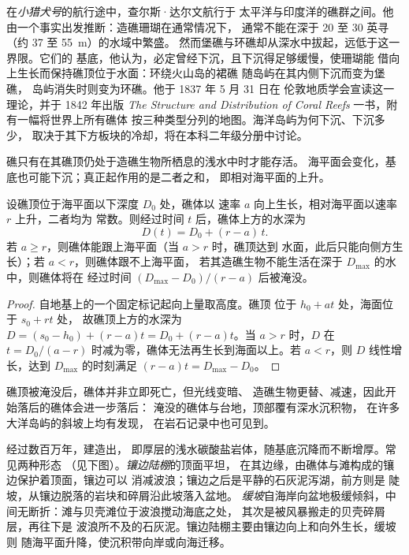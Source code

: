 
\begin{history}[沉降基底上的礁，1837--1842]
在\emph{小猎犬号}的航行途中，查尔斯·达尔文航行于
太平洋与印度洋的礁群之间。他由一个事实出发推断：造礁珊瑚在通常情况下，
通常不能在深于 20 至 30 英寻（约 37 至 \qty{55}{m}）的水域中繁盛。
然而堡礁与环礁却从深水中拔起，远低于这一界限。它们的
基底，他认为，必定曾经下沉，且下沉得足够缓慢，使珊瑚能
借向上生长而保持礁顶位于水面：环绕火山岛的裙礁
随岛屿在其内侧下沉而变为堡礁，
岛屿消失时则变为环礁。他于 1837 年 5 月 31 日在
伦敦地质学会宣读这一理论，并于 1842 年出版 \emph{The Structure and
Distribution of Coral Reefs} 一书，附有一幅将世界上所有礁体
按三种类型分列的地图。海洋岛屿为何下沉、下沉多少，
取决于其下方板块的冷却，将在本科二年级分册中讨论。
\end{history}

礁只有在其礁顶仍处于造礁生物所栖息的浅水中时才能存活。
海平面会变化，基底也可能下沉；真正起作用的是二者之和，
即相对海平面的上升。

\begin{proposition}[跟上或淹没]\label{prop:b1:chemical-biogenic-sediments:keep-up}
设礁顶位于海平面以下深度 $D_0$ 处，礁体以
速率 $a$ 向上生长，相对海平面以速率 $r$ 上升，二者均为
常数。则经过时间 $t$ 后，礁体上方的水深为
\[
D(t) = D_0 + (r - a)\,t .
\]
若 $a \ge r$，则礁体能跟上海平面（当 $a > r$ 时，礁顶达到
水面，此后只能向侧方生长）；若 $a < r$，则礁体跟不上海平面，
若其造礁生物不能生活在深于 $D_{\max}$ 的水中，则礁体将在
经过时间 $(D_{\max} - D_0)/(r - a)$ 后被淹没。
\end{proposition}

\begin{proof}
自地基上的一个固定标记起向上量取高度。礁顶
位于 $h_0 + a t$ 处，海面位于 $s_0 + r t$ 处，
故礁顶上方的水深为 $D = (s_0 - h_0) + (r - a)t = D_0 + (r-a)t$。当 $a > r$ 时，$D$
在 $t = D_0/(a-r)$ 时减为零，礁体无法再生长到海面以上。若
$a < r$，则 $D$ 线性增长，达到 $D_{\max}$ 的时刻满足 $(r-a)t = D_{\max} -
D_0$。
\end{proof}

礁顶被淹没后，礁体并非立即死亡，但光线变暗、
造礁生物更替、减速，因此开始落后的礁体会进一步落后：
淹没的礁体与台地，顶部覆有深水沉积物，
在许多大洋岛屿的斜坡上均有发现，
在岩石记录中也可见到。

经过数百万年，建造出，
即厚层的浅水碳酸盐岩体，随基底沉降而不断增厚。常见两种形态
（见下图）。\emph{镶边陆棚}的顶面平坦，
在其边缘，由礁体与滩构成的镶边保护着顶面，镶边可以
消减波浪；镶边之后是平静的石灰泥泻湖，前方则是
陡坡，从镶边脱落的岩块和碎屑沿此坡落入盆地。
\emph{缓坡}自海岸向盆地极缓倾斜，中间无断折：滩与贝壳滩位于波浪搅动海底之处，
其次是被风暴搬走的贝壳碎屑层，再往下是
波浪所不及的石灰泥。镶边陆棚主要由镶边向上和向外生长，缓坡则
随海平面升降，使沉积带向岸或向海迁移。

